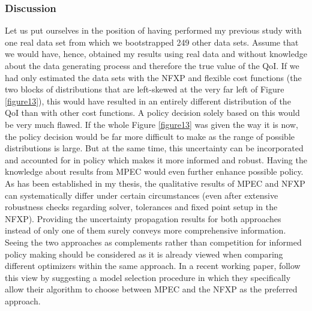 \subsubsection{Discussion}

Let us put ourselves in the position of having performed my previous study with one real data set from which we bootstrapped 249 other data sets. Assume that we would have, hence, obtained my results using real data and without knowledge about the data generating process and therefore the true value of the QoI. If we had only estimated the data sets with the NFXP and flexible cost functions (the two blocks of distributions that are left-skewed at the very far left of Figure \ref{figure13}), this would have resulted in an entirely different distribution of the QoI than with other cost functions. A policy decision solely based on this would be very much flawed. If the whole Figure \ref{figure13} was given the way it is now, the policy decision would be far more difficult to make as the range of possible distributions is large. But at the same time, this uncertainty can be incorporated and accounted for in policy which makes it more informed and robust. Having the knowledge about results from MPEC would even further enhance possible policy. As has been established in my thesis, the qualitative results of MPEC and NFXP can systematically differ under certain circumstances (even after extensive robustness checks regarding solver, tolerances and fixed point setup in the NFXP). Providing the uncertainty propagation results for both approaches instead of only one of them surely conveys more comprehensive information. Seeing the two approaches as complements rather than competition for informed policy making should be considered as it is already viewed when comparing different optimizers within the same approach. In a recent working paper, \cite{Komiyama.2018} follow this view by suggesting a model selection procedure in which they specifically allow their algorithm to choose between MPEC and the NFXP as the preferred approach.

